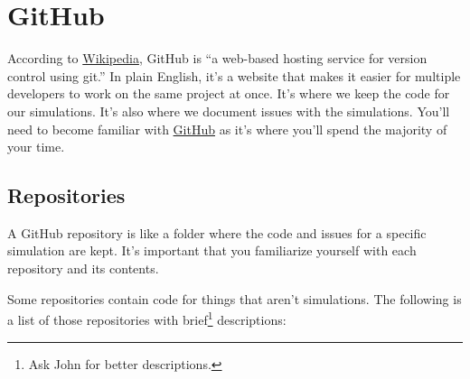 \documentclass[titlepage]{article}
\begin{document}
\pagebreak


\section{GitHub}

According to \href{https://en.wikipedia.org/wiki/GitHub}{Wikipedia}, GitHub is ``a web-based hosting service for version control using git.'' In plain English, it's a website that makes it easier for multiple developers to work on the same project at once. It's where we keep the code for our simulations. It's also where we document issues with the simulations. You'll need to become familiar with \href{https://github.com/phetsims}{GitHub} as it's where you'll spend the majority of your time.

	\subsection{Repositories}

A GitHub repository is like a folder where the code and issues for a specific simulation are kept. It's important that you familiarize yourself with each repository and its contents.

Some repositories contain code for things that aren't simulations. The following is a list of those repositories with brief\footnote{Ask John for better descriptions.} descriptions:
\end{document}
